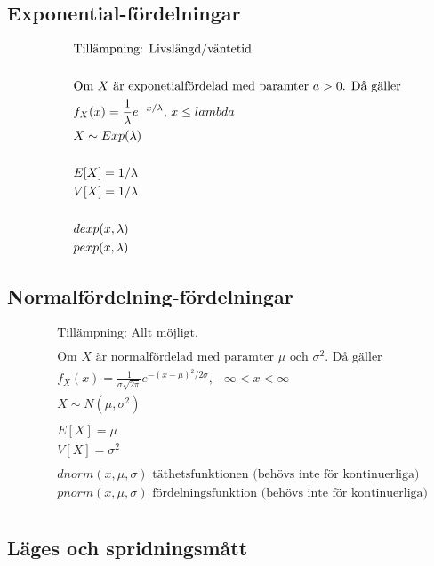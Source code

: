 \subsection{Exponential-fördelningar}
\begin{align*}
  &\quad  \text{Tillämpning: Livslängd/väntetid.} \\
  &\quad  \\
  &\quad  \text{Om $X$ är exponetialfördelad med paramter $ a > 0 $. Då gäller} \\
  &\quad  f_X(x) = \frac{1}{\lambda} e^{-x/\lambda}, \, x\leq{lambda} \\
  &\quad  X \sim Exp(\lambda) \\
  &\quad  \\
  &\quad  E[X]= 1/\lambda \\
  &\quad  V[X]= 1/\lambda \\
  &\quad  \\
  &\quad  dexp(x, \lambda) \\
  &\quad  pexp(x, \lambda) \\
\end{align*}

\subsection{Normalfördelning-fördelningar}
\begin{align*}
  &\quad  \text{Tillämpning: Allt möjligt.} \\
  &\quad  \\
  &\quad  \text{Om $X$ är normalfördelad med paramter $\mu$ och $\sigma^2$. Då gäller} \\
  &\quad  f_X(x) = \frac{1}{\sigma\sqrt{2\pi}} e^{-(x-\mu)^2/2\sigma}, -\infty<x<\infty \\
  &\quad  X \sim N(\mu,\sigma^2) \\
  &\quad  \\
  &\quad  E[X]= \mu \\
  &\quad  V[X]= \sigma^2 \\
  &\quad  \\
  &\quad  dnorm(x, \mu, \sigma) \text{ täthetsfunktionen (behövs inte för kontinuerliga)} \\
  &\quad  pnorm(x, \mu, \sigma) \text{ fördelningsfunktion (behövs inte för kontinuerliga)} \\
\end{align*}


\subsection{Läges och spridningsmått}
